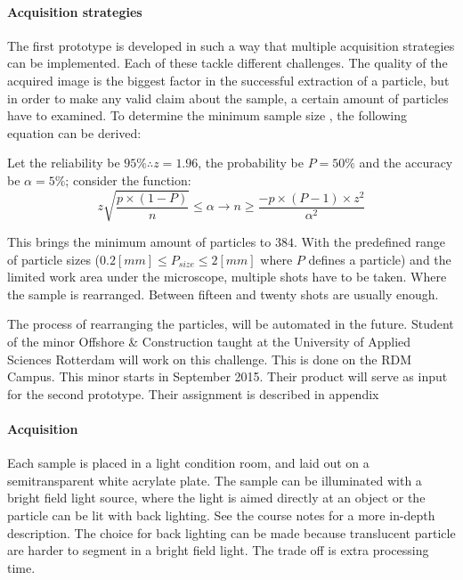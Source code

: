 \documentclass[11pt,fleqn,,a4paper,twoside,openright]{book}
\begin{document}
\paragraph{Acquisition strategies}The first prototype is developed in such a way that multiple acquisition strategies can be implemented. Each of these tackle different challenges. The quality of the acquired image is the biggest factor in the successful extraction of a particle, but in order to make any valid claim about the sample, a certain amount of particles have to examined. To determine the minimum sample size , the following equation can be derived:
\begin{sBox}
	Let the reliability be $95\% \therefore z=1.96$, the probability be $P=50\%$ and the accuracy be $\alpha=5\%$; consider the function:
	\begin{equation}
	z\sqrt{\frac{p\times(1-P)}{n}}\leq\alpha \rightarrow n\geq\frac{-p\times(P-1)\times z^2}{\alpha^2}
	\end{equation}
\end{sBox}
This brings the minimum amount of particles to $384$. With the predefined range of particle sizes ($0.2[mm]\leq P_{size} \leq 2[mm]$ where $P$ defines a particle) and the limited work area under the microscope, multiple shots have to be taken. Where the sample is rearranged. Between fifteen and twenty shots are usually enough.
\begin{remark}
	 The process of rearranging the particles, will be automated in the future. Student of the minor Offshore \& Construction taught at the University of Applied Sciences Rotterdam will work on this challenge. This is done on the RDM Campus. This minor starts in September 2015. Their product will serve as input for the second prototype. Their assignment is described in appendix %
\end{remark}

\paragraph{Acquisition}  Each sample is placed in a light condition room, and laid out on a semitransparent white acrylate plate. The sample can be illuminated with a bright field light source, where the light is aimed directly at an object or the particle can be lit with back lighting. See the course notes \cite{ypma_course_2014} for a more in-depth description. The choice for back lighting can be made because translucent particle are harder to segment in a bright field light. The trade off is extra processing time.
\end{document}

